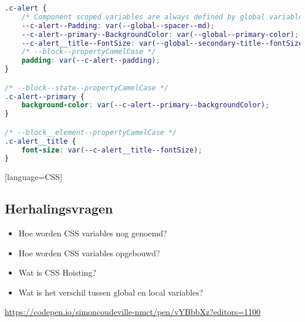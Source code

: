 \documentclass{article}
\begin{document}
\begin{lstlisting}[language=CSS]
.c-alert {
    /* Component scoped variables are always defined by global variables */
    --c-alert--Padding: var(--global--spacer--md);
    --c-alert--primary--BackgroundColor: var(--global--primary-color);
    --c-alert__title--FontSize: var(--global--secondary-title--fontSize);
    /* --block--propertyCamelCase */
    padding: var(--c-alert--padding);
}

/* --block--state--propertyCamelCase */
.c-alert--primary {
    background-color: var(--c-alert--primary--backgroundColor);
}

/* --block__element--propertyCamelCase */
.c-alert__title {
    font-size: var(--c-alert__title--fontSize);
}
\end{lstlisting}[language=CSS]

\subsection{Herhalingsvragen}

\begin{itemize}
    \item Hoe worden CSS variables nog genoemd?
    \item Hoe worden CSS variables opgebouwd?
    \item Wat is CSS Hoisting?
    \item Wat is het verschil tussen global en local variables?
\end{itemize}

\url{https://codepen.io/simoncoudeville-nmct/pen/vYBbbXz?editors=1100}
\end{document}
